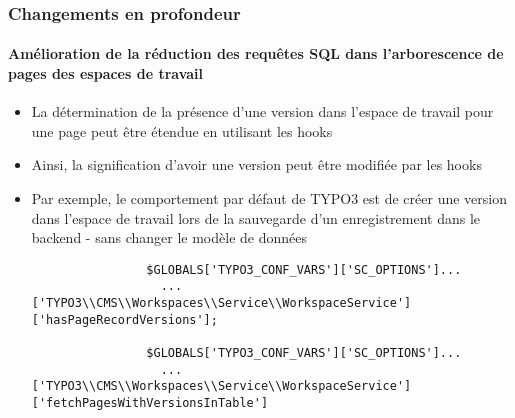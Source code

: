 \begin{frame}[fragile]
	\frametitle{Changements en profondeur}
	\framesubtitle{Amélioration de la réduction des requêtes SQL dans l'arborescence de pages des espaces de travail}

	\lstset{basicstyle=\tiny\ttfamily}

	\begin{itemize}

		\item La détermination de la présence d'une version dans l'espace de travail
			pour une page peut être étendue en utilisant les hooks

		\item Ainsi, la signification d'avoir une version peut être modifiée par
			les hooks

		\item Par exemple, le comportement par défaut de TYPO3 est de créer une
			version dans l'espace de travail lors de la sauvegarde d'un enregistrement
			dans le backend - sans changer le modèle de données

			\begin{lstlisting}
				$GLOBALS['TYPO3_CONF_VARS']['SC_OPTIONS']...
				  ...['TYPO3\\CMS\\Workspaces\\Service\\WorkspaceService']['hasPageRecordVersions'];

				$GLOBALS['TYPO3_CONF_VARS']['SC_OPTIONS']...
				  ...['TYPO3\\CMS\\Workspaces\\Service\\WorkspaceService']['fetchPagesWithVersionsInTable']
			\end{lstlisting}

	\end{itemize}

\end{frame}


